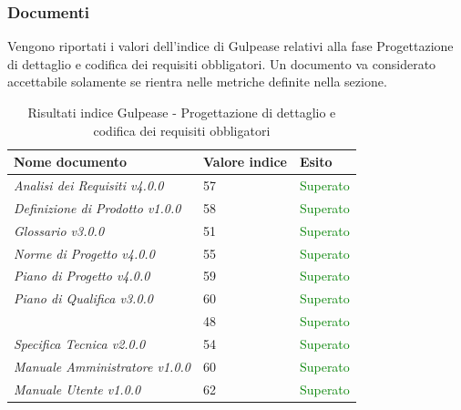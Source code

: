 	 	\subsubsection{Documenti}	 	
	 	Vengono riportati i valori dell'indice di Gulpease relativi alla fase Progettazione di dettaglio e codifica dei requisiti obbligatori. Un documento va considerato accettabile solamente se rientra nelle metriche definite nella sezione.
		\begin{table}[!ht]
			\begin{center}
				\begin{tabularx}{0.9\textwidth}{|l|l|X|}
					\hline
					\textbf{Nome documento} & \textbf{Valore indice} & \textbf{Esito}\\
					\hline						
					\emph{Analisi dei Requisiti v4.0.0} & 57 & \textcolor{green}{Superato}\\
					\hline
					\emph{Definizione di Prodotto v1.0.0} & 58 & \textcolor{green}{Superato}\\
					\hline
					\emph{Glossario v3.0.0} & 51 & \textcolor{green}{Superato}\\
					\hline					
					\emph{Norme di Progetto v4.0.0} & 55 & \textcolor{green}{Superato}\\
					\hline					
					\emph{Piano di Progetto v4.0.0} & 59 & \textcolor{green}{Superato}\\
					\hline					
					\emph{Piano di Qualifica v3.0.0} & 60 & \textcolor{green}{Superato}\\
					\hline					
					\docNameVersionSdF & 48 & \textcolor{green}{Superato}\\
					\hline	
					\emph{Specifica Tecnica v2.0.0} & 54 & \textcolor{green}{Superato}\\
					\hline
					\emph{Manuale Amministratore v1.0.0} & 60 & \textcolor{green}{Superato}\\
					\hline
					\emph{Manuale Utente v1.0.0} & 62 & \textcolor{green}{Superato}\\			
					\hline
				\end{tabularx}
			\end{center}
			\caption{Risultati indice Gulpease - Progettazione di dettaglio e codifica dei requisiti obbligatori}
		\end{table}
		
